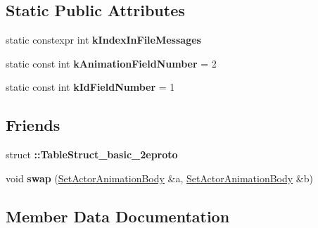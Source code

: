 \subsection*{Static Public Attributes}
\begin{DoxyCompactItemize}
\item 
static constexpr int {\bfseries k\+Index\+In\+File\+Messages}
\item 
\mbox{\label{classtbBasics_1_1SetActorAnimationBody_ae89b5ba9e1ffa76aeb249800f4cc937b}} 
static const int {\bfseries k\+Animation\+Field\+Number} = 2
\item 
\mbox{\label{classtbBasics_1_1SetActorAnimationBody_ab97ccc2adb8acca1f745e0b11cede295}} 
static const int {\bfseries k\+Id\+Field\+Number} = 1
\end{DoxyCompactItemize}
\subsection*{Friends}
\begin{DoxyCompactItemize}
\item 
\mbox{\label{classtbBasics_1_1SetActorAnimationBody_ae86a2f4c520666b65d606ccbe2122e61}} 
struct {\bfseries \+::\+Table\+Struct\+\_\+basic\+\_\+2eproto}
\item 
\mbox{\label{classtbBasics_1_1SetActorAnimationBody_aaa64d062b83f49384b97f105dcf77f39}} 
void {\bfseries swap} (\hyperlink{classtbBasics_1_1SetActorAnimationBody}{Set\+Actor\+Animation\+Body} \&a, \hyperlink{classtbBasics_1_1SetActorAnimationBody}{Set\+Actor\+Animation\+Body} \&b)
\end{DoxyCompactItemize}


\subsection{Member Data Documentation}
\mbox{\label{classtbBasics_1_1SetActorAnimationBody_a2ddf09575c42408a25b7d3a93d2064d4}} 
